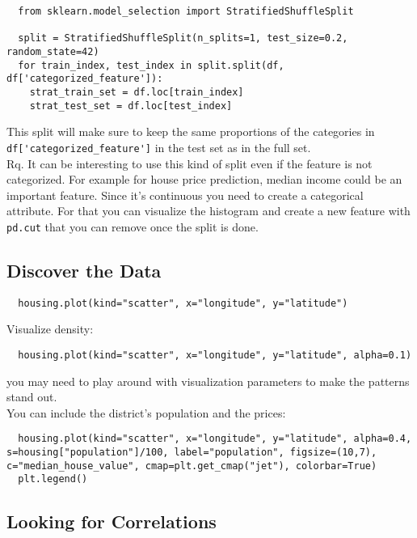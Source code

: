 \documentclass[french]{article}
\begin{document}
\begin{lstlisting}
  from sklearn.model_selection import StratifiedShuffleSplit

  split = StratifiedShuffleSplit(n_splits=1, test_size=0.2, random_state=42)
  for train_index, test_index in split.split(df, df['categorized_feature']):
    strat_train_set = df.loc[train_index]
    strat_test_set = df.loc[test_index]
\end{lstlisting}

This split will make sure to keep the same proportions of the categories in \\\lstinline{df['categorized_feature']} in the test set as in the full set.\\

Rq. It can be interesting to use this kind of split even if the feature is not categorized. For example for house price prediction, median income could be an important feature. Since it's continuous you need to create a categorical attribute. For that you can visualize the histogram and create a new feature with \lstinline{pd.cut} that you can remove once the split is done.

\subsection{Discover the Data}

\begin{lstlisting}
  housing.plot(kind="scatter", x="longitude", y="latitude")
\end{lstlisting}

Visualize density:
\begin{lstlisting}
  housing.plot(kind="scatter", x="longitude", y="latitude", alpha=0.1)
\end{lstlisting}

you may need to play around with visualization parameters to make the patterns stand out.\\

You can include the district's population and the prices:
\begin{lstlisting}
  housing.plot(kind="scatter", x="longitude", y="latitude", alpha=0.4, s=housing["population"]/100, label="population", figsize=(10,7), c="median_house_value", cmap=plt.get_cmap("jet"), colorbar=True)
  plt.legend()
\end{lstlisting}

\subsection{Looking for Correlations}
\end{document}
